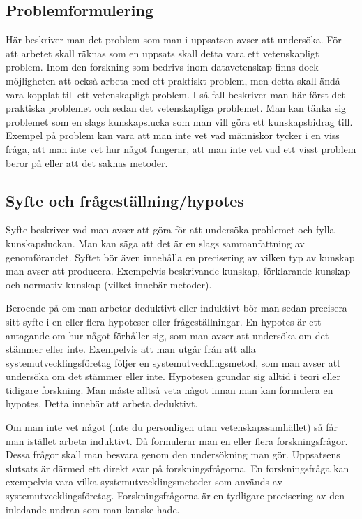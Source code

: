 \documentclass[a4paper,12pt]{article} %
\begin{document}
\subsection{Problemformulering}
Här beskriver man det problem som man i uppsatsen avser att undersöka. För att arbetet skall räknas som en uppsats skall detta vara ett vetenskapligt problem. Inom den forskning som bedrivs inom datavetenskap finns dock möjligheten att också arbeta med ett praktiskt problem, men detta skall ändå vara kopplat till ett vetenskapligt problem. I så fall beskriver man här först det praktiska problemet och sedan det vetenskapliga problemet. Man kan tänka sig problemet som en slags kunskapslucka som man vill göra ett kunskapsbidrag till. Exempel på problem kan vara att man inte vet vad människor tycker i en viss fråga, att man inte vet hur något fungerar, att man inte vet vad ett visst problem beror på eller att det saknas metoder.

\subsection{Syfte och frågeställning/hypotes}
Syfte beskriver vad man avser att göra för att undersöka problemet och fylla kunskapsluckan. Man kan säga att det är en slags sammanfattning av genomförandet. Syftet bör även innehålla en precisering av vilken typ av kunskap man avser att producera. Exempelvis beskrivande kunskap, förklarande kunskap och normativ kunskap (vilket innebär metoder).

Beroende på om man arbetar deduktivt eller induktivt bör man sedan precisera sitt syfte i en eller flera hypoteser eller frågeställningar. En hypotes är ett antagande om hur något förhåller sig, som man avser att undersöka om det stämmer eller inte. Exempelvis att man utgår från att alla systemutvecklingsföretag följer en systemutvecklingsmetod, som man avser att undersöka om det stämmer eller inte. Hypotesen grundar sig alltid i teori eller tidigare forskning. Man måste alltså veta något innan man kan formulera en hypotes. Detta innebär att arbeta deduktivt.

Om man inte vet något (inte du personligen utan vetenskapssamhället) så får man istället arbeta induktivt. Då formulerar man en eller flera forskningsfrågor. Dessa frågor skall man besvara genom den undersökning man gör. Uppsatsens slutsats är därmed ett direkt svar på forskningsfrågorna. En forskningsfråga kan exempelvis vara vilka systemutvecklingsmetoder som används av systemutvecklingsföretag. Forskningsfrågorna är en tydligare precisering av den inledande undran som man kanske hade.
\end{document}
